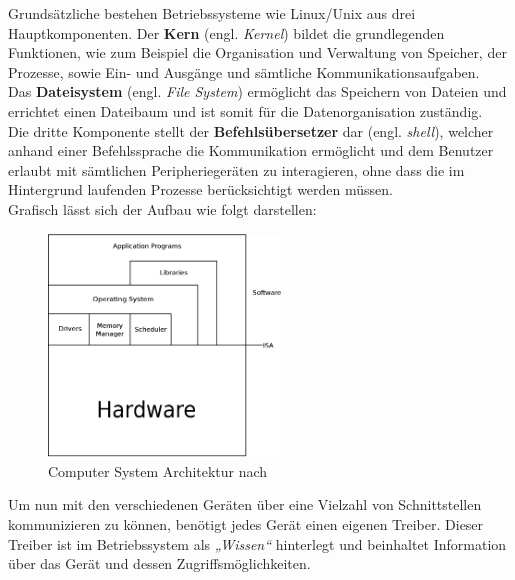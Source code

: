 Grundsätzliche bestehen Betriebssysteme wie Linux/Unix aus drei Hauptkomponenten.
Der \textbf{Kern} (engl. \emph{Kernel}) bildet die grundlegenden Funktionen, wie
zum Beispiel die Organisation und Verwaltung von Speicher, der Prozesse, sowie
Ein- und Ausgänge und sämtliche Kommunikationsaufgaben.\\
Das \textbf{Dateisystem} (engl. \emph{File System}) ermöglicht das Speichern von Dateien
und errichtet einen Dateibaum und ist somit für die Datenorganisation zuständig.\\
Die dritte Komponente stellt der \textbf{Befehlsübersetzer} dar (engl. \emph{shell}),
welcher anhand einer Befehlssprache die Kommunikation ermöglicht und dem Benutzer erlaubt
mit sämtlichen Peripheriegeräten zu interagieren, ohne dass die im Hintergrund laufenden
Prozesse berücksichtigt werden müssen.~\cite{ubuntu}\\

Grafisch lässt sich der Aufbau wie folgt darstellen:\\

\begin{figure}[H]
\centering
\includegraphics[width=0.55\textwidth]{Hauptteil/csa.eps}
\caption{Computer System Architektur nach~\cite{virtualmachines}}
\label{fig:mbs}
\end{figure}

Um nun mit den verschiedenen Geräten über eine Vielzahl von Schnittstellen kommunizieren
zu können, benötigt jedes Gerät einen eigenen Treiber. Dieser Treiber ist im Betriebssystem
als \emph{„Wissen“} hinterlegt und beinhaltet Information über das Gerät und dessen
Zugriffsmöglichkeiten.~\cite{treiber}\\


